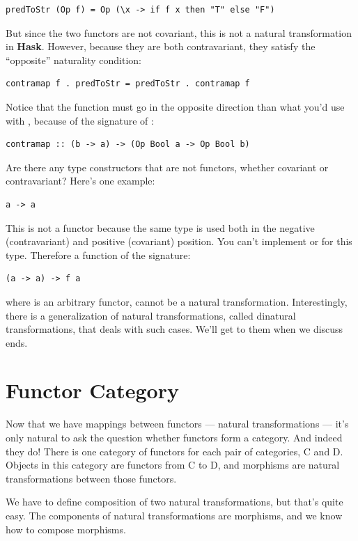 \begin{verbatim}
predToStr (Op f) = Op (\x -> if f x then "T" else "F")
\end{verbatim}
But since the two functors are not covariant, this is not a natural
transformation in \textbf{Hask}. However, because they are both
contravariant, they satisfy the ``opposite'' naturality condition:

\begin{verbatim}
contramap f . predToStr = predToStr . contramap f
\end{verbatim}
Notice that the function  must go in the opposite direction
than what you'd use with , because of the signature of
:

\begin{verbatim}
contramap :: (b -> a) -> (Op Bool a -> Op Bool b)
\end{verbatim}
Are there any type constructors that are not functors, whether covariant
or contravariant? Here's one example:

\begin{verbatim}
a -> a
\end{verbatim}
This is not a functor because the same type  is used both in
the negative (contravariant) and positive (covariant) position. You
can't implement  or  for this type.
Therefore a function of the signature:

\begin{verbatim}
(a -> a) -> f a
\end{verbatim}
where  is an arbitrary functor, cannot be a natural
transformation. Interestingly, there is a generalization of natural
transformations, called dinatural transformations, that deals with such
cases. We'll get to them when we discuss ends.

\section{Functor Category}\label{functor-category}

Now that we have mappings between functors --- natural transformations
--- it's only natural to ask the question whether functors form a
category. And indeed they do! There is one category of functors for each
pair of categories, C and D. Objects in this category are functors from
C to D, and morphisms are natural transformations between those
functors.

We have to define composition of two natural transformations, but that's
quite easy. The components of natural transformations are morphisms, and
we know how to compose morphisms.


